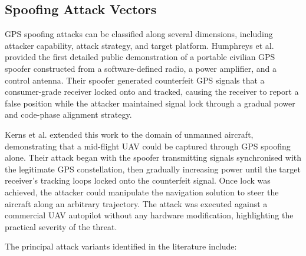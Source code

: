 \documentclass[electronics,article,accept,moreauthors]{Definitions/mdpi}
\begin{document}
\subsection{Spoofing Attack Vectors}
\label{sec:spoofingvectors}

GPS spoofing attacks can be classified along several dimensions, including attacker capability, attack strategy, and target platform. Humphreys et al. \citep{humphreys2012} provided the first detailed public demonstration of a portable civilian GPS spoofer constructed from a software-defined radio, a power amplifier, and a control antenna. Their spoofer generated counterfeit GPS signals that a consumer-grade receiver locked onto and tracked, causing the receiver to report a false position while the attacker maintained signal lock through a gradual power and code-phase alignment strategy.

Kerns et al. \citep{kerns2014} extended this work to the domain of unmanned aircraft, demonstrating that a mid-flight UAV could be captured through GPS spoofing alone. Their attack began with the spoofer transmitting signals synchronised with the legitimate GPS constellation, then gradually increasing power until the target receiver's tracking loops locked onto the counterfeit signal. Once lock was achieved, the attacker could manipulate the navigation solution to steer the aircraft along an arbitrary trajectory. The attack was executed against a commercial UAV autopilot without any hardware modification, highlighting the practical severity of the threat.

The principal attack variants identified in the literature include:
\end{document}
